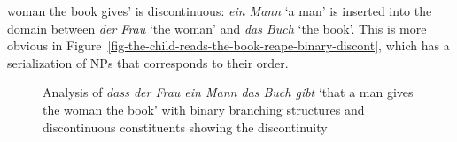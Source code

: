 woman the book gives' is discontinuous: \emph{ein Mann} `a man' is inserted into the domain between
\emph{der Frau} `the woman' and \emph{das Buch} `the book'.  This is more obvious in Figure~\vref{fig-the-child-reads-the-book-reape-binary-discont}, which has a serialization of NPs that
corresponds to their order.
\begin{figure}
\caption{\label{fig-the-child-reads-the-book-reape-binary-discont}Analysis of \emph{dass der Frau ein Mann das Buch
    gibt} `that a man gives the woman the book' with binary branching structures and discontinuous
  constituents showing the discontinuity}
\end{figure}%

